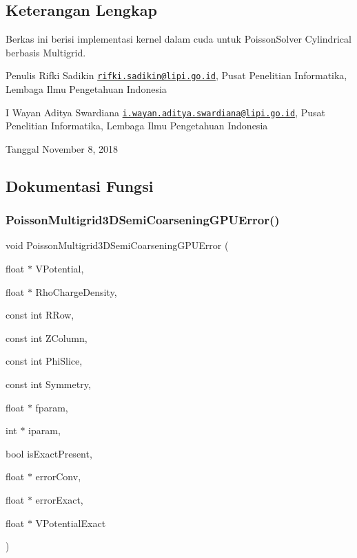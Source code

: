 \subsection{Keterangan Lengkap}
Berkas ini berisi implementasi kernel dalam cuda untuk Poisson\+Solver Cylindrical berbasis Multigrid. 

\begin{DoxyAuthor}{Penulis}
Rifki Sadikin \href{mailto:rifki.sadikin@lipi.go.id}{\tt rifki.\+sadikin@lipi.\+go.\+id}, Pusat Penelitian Informatika, Lembaga Ilmu Pengetahuan Indonesia 

I Wayan Aditya Swardiana \href{mailto:i.wayan.aditya.swardiana@lipi.go.id}{\tt i.\+wayan.\+aditya.\+swardiana@lipi.\+go.\+id}, Pusat Penelitian Informatika, Lembaga Ilmu Pengetahuan Indonesia 
\end{DoxyAuthor}
\begin{DoxyDate}{Tanggal}
November 8, 2018 
\end{DoxyDate}


\subsection{Dokumentasi Fungsi}
\hypertarget{PoissonSolver3DGPU_8cu_a06ab6e8b953038a4d4d4ea5e1ab646e8}{}\label{PoissonSolver3DGPU_8cu_a06ab6e8b953038a4d4d4ea5e1ab646e8} 
\subsubsection{\texorpdfstring{Poisson\+Multigrid3\+D\+Semi\+Coarsening\+G\+P\+U\+Error()}{PoissonMultigrid3DSemiCoarseningGPUError()}}
{\footnotesize\ttfamily void Poisson\+Multigrid3\+D\+Semi\+Coarsening\+G\+P\+U\+Error (\begin{DoxyParamCaption}\item[{float $\ast$}]{V\+Potential,  }\item[{float $\ast$}]{Rho\+Charge\+Density,  }\item[{const int}]{R\+Row,  }\item[{const int}]{Z\+Column,  }\item[{const int}]{Phi\+Slice,  }\item[{const int}]{Symmetry,  }\item[{float $\ast$}]{fparam,  }\item[{int $\ast$}]{iparam,  }\item[{bool}]{is\+Exact\+Present,  }\item[{float $\ast$}]{error\+Conv,  }\item[{float $\ast$}]{error\+Exact,  }\item[{float $\ast$}]{V\+Potential\+Exact }\end{DoxyParamCaption})}

